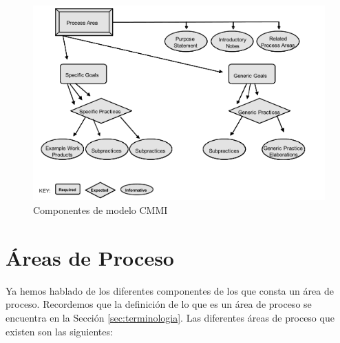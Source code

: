 \begin{itemize}
\begin{figure}[h]
	\centering
	\includegraphics[scale=1]{Images/modelcom}
	\caption{Componentes de modelo CMMI}
	\label{fig:modelcom}
\end{figure}

\section{Áreas de Proceso}
Ya hemos hablado de los diferentes componentes de los que consta un área de proceso. Recordemos que la definición de lo que es un área de proceso se encuentra en la Sección \ref{sec:terminologia}. Las diferentes áreas de proceso que existen son las siguientes:


\end{itemize}

